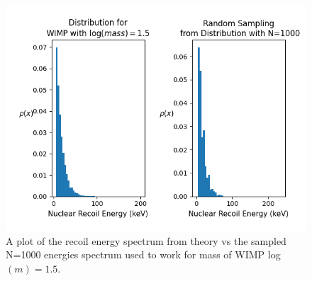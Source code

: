 \documentclass[11pt]{article} %
\begin{document}
\begin{figure}[H]
\centering
\includegraphics[scale=0.7]{images/Ar_c1dat_m1-5.png}
\caption{A plot of the recoil energy spectrum from theory vs the sampled N=1000 energies spectrum used to work for mass of WIMP log$(m)=1.5$.}
\label{fig:recoil}
\end{figure}
\end{document}
